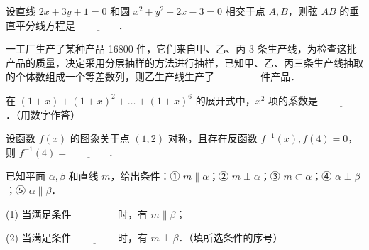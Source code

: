 \begin{question}
设直线 $2x + 3y + 1 = 0$ 和圆 $x^2 + y^2 - 2x - 3 = 0$ 相交于点 $A, B$，则弦 $AB$ 的垂直平分线方程是 $\underline{\qquad\qquad}$．

\end{question}
\begin{question}
一工厂生产了某种产品 16800 件，它们来自甲、乙、丙 3 条生产线，为检查这批产品的质量，决定采用分层抽样的方法进行抽样，已知甲、乙、丙三条生产线抽取的个体数组成一个等差数列，则乙生产线生产了 $\underline{\qquad\qquad}$ 件产品．

\end{question}
\begin{question}
在 $(1 + x) + (1 + x)^2 + \dots + (1 + x)^6$ 的展开式中，$x^2$ 项的系数是 $\underline{\qquad\qquad}$．（用数字作答）

\end{question}
\begin{question}
设函数 $f(x)$ 的图象关于点 $(1, 2)$ 对称，且存在反函数 $f^{-1}(x), f(4) = 0$，则 $f^{-1}(4) = \underline{\qquad\qquad}$．

\end{question}
\begin{question}
已知平面 $\alpha, \beta$ 和直线 $m$，给出条件：① $m \parallel \alpha$；② $m \perp \alpha$；③ $m \subset \alpha$；④ $\alpha \perp \beta$；⑤ $\alpha \parallel \beta$．

(1) 当满足条件 $\underline{\qquad\qquad}$ 时，有 $m \parallel \beta$；

(2) 当满足条件 $\underline{\qquad\qquad}$ 时，有 $m \perp \beta$．（填所选条件的序号）

\end{question}

